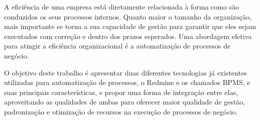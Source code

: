 A eficiência de uma empresa está diretamente relacionada à forma como são conduzidos os seus processos internos. Quanto maior o tamanho da organização, mais importante se torna a sua capacidade de gestão para garantir que eles sejam executados com correção e dentro dos prazos esperados. Uma abordagem efetiva para atingir a eficiência organizacional é a automatização de processos de negócio.

O objetivo deste trabalho é apresentar duas diferentes tecnologias já existentes utilizadas para automatização de processos, o Redmine e os chamados BPMS, e suas principais características, e propor uma forma de integração entre elas, aproveitando as qualidades de ambas para oferecer maior qualidade de gestão, padronização e otimização de recursos na execução de processos de negócio.